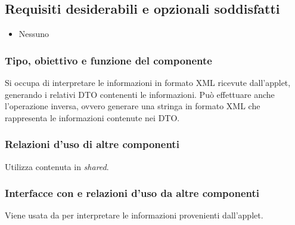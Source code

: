 \subsection*{Requisiti desiderabili e opzionali soddisfatti}
\begin{itemize}
    \item Nessuno
\end{itemize}
\subsubsection*{Tipo, obiettivo e funzione del componente}
Si occupa di interpretare le informazioni in formato XML ricevute dall'applet,
generando i relativi DTO contenenti le informazioni. Pu\`o effettuare anche
l'operazione inversa, ovvero generare una stringa in formato XML che rappresenta
le informazioni contenute nei DTO.
\subsubsection*{Relazioni d'uso di altre componenti}
Utilizza  contenuta in \emph{shared}.
\subsubsection*{Interfacce con e relazioni d'uso da altre componenti}
Viene usata da  per interpretare le informazioni provenienti
dall'applet.
